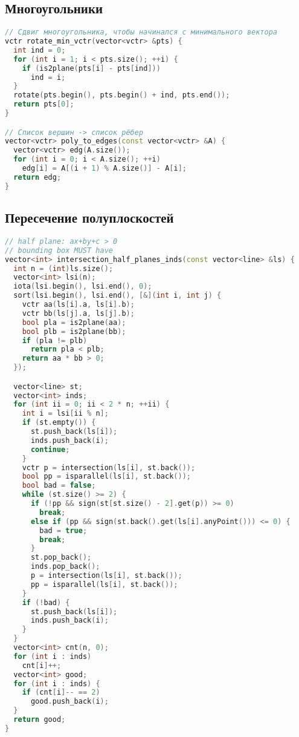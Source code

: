 \documentclass[10pt,a4paper,landscape,twosided]{extarticle}
\begin{document}
\begin{multicols*}{3}
\begin{lstlisting}[language=C++]
\end{lstlisting}

\subsection{Многоугольники}
\begin{lstlisting}[language=C++]
// Сдвиг многоугольника, чтобы начинался с минимального вектора
vctr rotate_min_vctr(vector<vctr> &pts) {
  int ind = 0;
  for (int i = 1; i < pts.size(); ++i) {
    if (is2plane(pts[i] - pts[ind]))
      ind = i;
  }
  rotate(pts.begin(), pts.begin() + ind, pts.end());
  return pts[0];
}

// Список вершин -> список рёбер
vector<vctr> poly_to_edges(const vector<vctr> &A) {
  vector<vctr> edg(A.size());
  for (int i = 0; i < A.size(); ++i)
    edg[i] = A[(i + 1) % A.size()] - A[i];
  return edg;
}

\end{lstlisting}

\subsection{Пересечение полуплоскостей}
\begin{lstlisting}[language=C++]
// half plane: ax+by+c > 0
// bounding box MUST have
vector<int> intersection_half_planes_inds(const vector<line> &ls) {
  int n = (int)ls.size();
  vector<int> lsi(n);
  iota(lsi.begin(), lsi.end(), 0);
  sort(lsi.begin(), lsi.end(), [&](int i, int j) {
    vctr aa(ls[i].a, ls[i].b);
    vctr bb(ls[j].a, ls[j].b);
    bool pla = is2plane(aa);
    bool plb = is2plane(bb);
    if (pla != plb)
      return pla < plb;
    return aa * bb > 0;
  });

  vector<line> st;
  vector<int> inds;
  for (int ii = 0; ii < 2 * n; ++ii) {
    int i = lsi[ii % n];
    if (st.empty()) {
      st.push_back(ls[i]);
      inds.push_back(i);
      continue;
    }
    vctr p = intersection(ls[i], st.back());
    bool pp = isparallel(ls[i], st.back());
    bool bad = false;
    while (st.size() >= 2) {
      if (!pp && sign(st[st.size() - 2].get(p)) >= 0)
        break;
      else if (pp && sign(st.back().get(ls[i].anyPoint())) <= 0) {
        bad = true;
        break;
      }
      st.pop_back();
      inds.pop_back();
      p = intersection(ls[i], st.back());
      pp = isparallel(ls[i], st.back());
    }
    if (!bad) {
      st.push_back(ls[i]);
      inds.push_back(i);
    }
  }
  vector<int> cnt(n, 0);
  for (int i : inds)
    cnt[i]++;
  vector<int> good;
  for (int i : inds) {
    if (cnt[i]-- == 2)
      good.push_back(i);
  }
  return good;
}


\end{lstlisting}
\end{multicols*}
\end{document}
